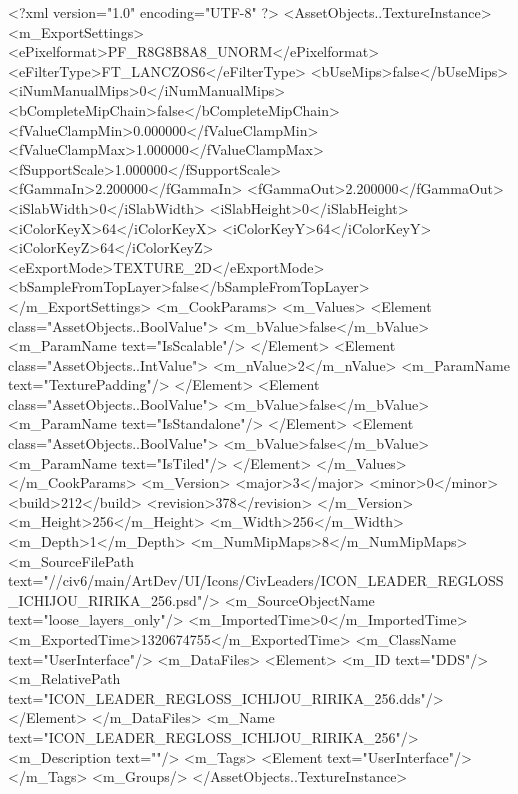 <?xml version="1.0" encoding="UTF-8" ?>
<AssetObjects..TextureInstance>
	<m_ExportSettings>
		<ePixelformat>PF_R8G8B8A8_UNORM</ePixelformat>
		<eFilterType>FT_LANCZOS6</eFilterType>
		<bUseMips>false</bUseMips>
		<iNumManualMips>0</iNumManualMips>
		<bCompleteMipChain>false</bCompleteMipChain>
		<fValueClampMin>0.000000</fValueClampMin>
		<fValueClampMax>1.000000</fValueClampMax>
		<fSupportScale>1.000000</fSupportScale>
		<fGammaIn>2.200000</fGammaIn>
		<fGammaOut>2.200000</fGammaOut>
		<iSlabWidth>0</iSlabWidth>
		<iSlabHeight>0</iSlabHeight>
		<iColorKeyX>64</iColorKeyX>
		<iColorKeyY>64</iColorKeyY>
		<iColorKeyZ>64</iColorKeyZ>
		<eExportMode>TEXTURE_2D</eExportMode>
		<bSampleFromTopLayer>false</bSampleFromTopLayer>
	</m_ExportSettings>
	<m_CookParams>
		<m_Values>
			<Element class="AssetObjects..BoolValue">
				<m_bValue>false</m_bValue>
				<m_ParamName text="IsScalable"/>
			</Element>
			<Element class="AssetObjects..IntValue">
				<m_nValue>2</m_nValue>
				<m_ParamName text="TexturePadding"/>
			</Element>
			<Element class="AssetObjects..BoolValue">
				<m_bValue>false</m_bValue>
				<m_ParamName text="IsStandalone"/>
			</Element>
			<Element class="AssetObjects..BoolValue">
				<m_bValue>false</m_bValue>
				<m_ParamName text="IsTiled"/>
			</Element>
		</m_Values>
	</m_CookParams>
	<m_Version>
		<major>3</major>
		<minor>0</minor>
		<build>212</build>
		<revision>378</revision>
	</m_Version>
	<m_Height>256</m_Height>
	<m_Width>256</m_Width>
	<m_Depth>1</m_Depth>
	<m_NumMipMaps>8</m_NumMipMaps>
	<m_SourceFilePath text="//civ6/main/ArtDev/UI/Icons/CivLeaders/ICON_LEADER_REGLOSS_ICHIJOU_RIRIKA_256.psd"/>
	<m_SourceObjectName text="loose_layers_only"/>
	<m_ImportedTime>0</m_ImportedTime>
	<m_ExportedTime>1320674755</m_ExportedTime>
	<m_ClassName text="UserInterface"/>
	<m_DataFiles>
		<Element>
			<m_ID text="DDS"/>
			<m_RelativePath text="ICON_LEADER_REGLOSS_ICHIJOU_RIRIKA_256.dds"/>
		</Element>
	</m_DataFiles>
	<m_Name text="ICON_LEADER_REGLOSS_ICHIJOU_RIRIKA_256"/>
	<m_Description text=""/>
	<m_Tags>
		<Element text="UserInterface"/>
	</m_Tags>
	<m_Groups/>
</AssetObjects..TextureInstance>

